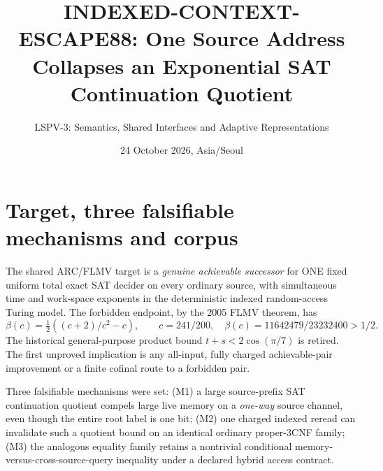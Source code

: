 \documentclass[11pt]{article}
\title{INDEXED-CONTEXT-ESCAPE88: One Source Address Collapses an Exponential SAT Continuation Quotient}
\author{LSPV-3: Semantics, Shared Interfaces and Adaptive Representations}
\date{24 October 2026, Asia/Seoul}
\begin{document}
\maketitle
\begin{center}
\end{center}

\section{Target, three falsifiable mechanisms and corpus}
The shared ARC/FLMV target is a \emph{genuine achievable successor} for ONE fixed uniform total exact SAT decider on every ordinary source, with simultaneous time and work-space exponents in the deterministic indexed random-access Turing model. The forbidden endpoint, by the 2005 FLMV theorem, has
\[
 \beta(c)=\tfrac12((c+2)/c^2-c),\qquad
 c=241/200,\quad \beta(c)=11642479/23232400>1/2.
\]
The historical general-purpose product bound $t+s<2\cos(\pi/7)$ is retired. The first unproved implication is any all-input, fully charged achievable-pair improvement or a finite cofinal route to a forbidden pair.

Three falsifiable mechanisms were set: (M1) a large source-prefix SAT continuation quotient compels large live memory on a \emph{one-way} source channel, even though the entire root label is one bit; (M2) one charged indexed reread can invalidate such a quotient bound on an identical ordinary proper-3CNF family; (M3) the analogous equality family retains a nontrivial conditional memory-versus-cross-source-query inequality under a declared hybrid access contract.
\end{document}
